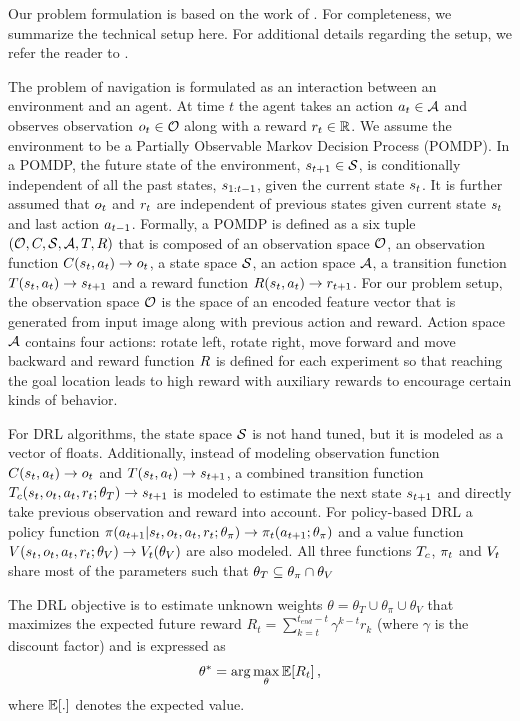Our problem formulation is based on the work of \cite{MiPaViICLR2017}. 
For completeness, we summarize the technical setup here.
For additional details regarding the setup, we refer the reader to \cite{MnBaMiICML2016,MiPaViICLR2017}.

The problem of navigation is formulated as an interaction between an environment and an agent.
At time $t$ the agent takes an action $a_t \in \mathcal{A}$ and observes observation $o_t \in \mathcal{O}$ along with a reward $r_t \in \mathbb{R}$.
We assume the environment to be a Partially Observable Markov Decision Process (POMDP).
In a POMDP, the future state of the environment, $s_{t+1} \in \mathcal{S}$, is conditionally independent of all the past states, $s_{1:t-1}$, given the current state $s_t$. It is further assumed that
$o_t$ and $r_t$ are independent of previous states given current state $s_t$ and last action $a_{t-1}$.
Formally, a POMDP is defined as a six tuple $(\mathcal{O}, C, \mathcal{S}, \mathcal{A}, T, R)$ that is composed of an observation space $\mathcal{O}$, an observation function $C(s_t, a_t) \rightarrow o_t$, a state space $\mathcal{S}$, an action space $\mathcal{A}$, a transition function $T(s_t, a_t) \rightarrow s_{t+1}$ and a reward function $R(s_t, a_t) \rightarrow r_{t+1}$.
For our problem setup, the observation space $\mathcal{O}$ is the space of an encoded feature vector that is generated from input image along with previous action and reward.
Action space $\mathcal{A}$ contains four actions: rotate left, rotate right, move forward and move backward and reward function $R$ is defined for each experiment so that reaching the goal location leads to high reward with auxiliary rewards to encourage certain kinds of behavior.

For DRL algorithms, the state space $\mathcal{S}$ is not hand tuned, but it is modeled as a vector of floats.
Additionally, instead of modeling observation function $C(s_t, a_t) \rightarrow o_t$ and $T(s_t, a_t) \rightarrow s_{t+1}$, a combined transition function $T_c(s_t, o_t, a_t, r_t; \theta_T) \rightarrow s_{t+1}$ is modeled to estimate the next state $s_{t+1}$ and directly take previous observation and reward into account.
For policy-based DRL a policy function $\pi(a_{t+1}|s_t, o_t, a_t, r_t; \theta_\pi) \rightarrow \pi_t(a_{t+1} ; \theta_\pi)$ and a value function $V(s_t, o_t, a_t, r_t; \theta_V) \rightarrow V_t(\theta_V)$ are also modeled.
All three functions $T_c$, $\pi_t$ and $V_t$ share most of the parameters such that $\theta_T \subseteq \theta_{\pi} \cap \theta_V$

The DRL objective is to estimate unknown weights $\theta = \theta_T \cup \theta_\pi \cup \theta_V$ that maximizes the expected future reward $R_t = \sum_{k=t}^{t_{end} - t} \gamma^{k-t} r_k$ (where $\gamma$ is the discount factor) and is expressed as
%
\begin{align}
\theta^* = \arg\max_{\theta} \mathbb{E}[R_t] \,,
\end{align}
where $\mathbb{E}[.]$ denotes the expected value.
%
%

